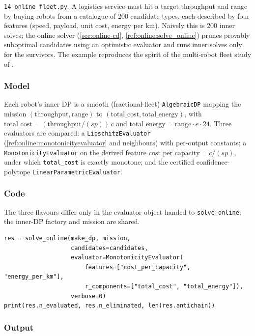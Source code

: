 \documentclass[11pt,a4paper]{article}
\begin{document}
\texttt{14\_online\_fleet.py}. A logistics service must hit a target
throughput and range by buying robots from a catalogue of 200 candidate
types, each described by four features (speed, payload, unit cost,
energy per km). Naively this is 200 inner solves; the online solver
(\ref{sec:online-cd}, \ref{ref:online:solve_online}) prunes provably
suboptimal candidates using an optimistic evaluator and runs inner
solves only for the survivors. The example reproduces the spirit of the
multi-robot fleet study of \citet{alharbi2026online}.

\subsubsection*{Model}

Each robot's inner DP is a smooth (fractional-fleet)
\texttt{AlgebraicDP} mapping the mission
$(\text{throughput}, \text{range})$ to
$(\text{total\_cost}, \text{total\_energy})$, with
$\text{total\_cost} = (\text{throughput}/(sp))\,c$ and
$\text{total\_energy} = \text{range}\cdot e \cdot 24$. Three evaluators
are compared: a \texttt{LipschitzEvaluator}
(\ref{ref:online:monotonicityevaluator} and neighbours) with per-output
constants; a \texttt{MonotonicityEvaluator} on the derived feature
$\text{cost\_per\_capacity} = c/(sp)$, under which \texttt{total\_cost}
is exactly monotone; and the certified confidence-polytope
\texttt{LinearParametricEvaluator}.

\subsubsection*{Code}

The three flavours differ only in the evaluator object handed to
\texttt{solve\_online}; the inner-DP factory and mission are shared.

\begin{lstlisting}
res = solve_online(make_dp, mission,
                   candidates=candidates,
                   evaluator=MonotonicityEvaluator(
                       features=["cost_per_capacity", "energy_per_km"],
                       r_components=["total_cost", "total_energy"]),
                   verbose=0)
print(res.n_evaluated, res.n_eliminated, len(res.antichain))
\end{lstlisting}

\subsubsection*{Output}
\end{document}

